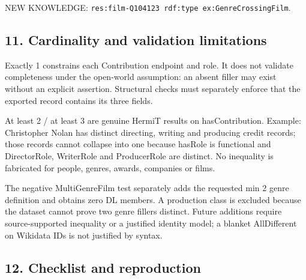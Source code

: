 \documentclass[
  11pt,
]{article}
\begin{document}
NEW KNOWLEDGE:
\texttt{res:\allowbreak{}film\allowbreak{}-\allowbreak{}\allowbreak{}Q104123\allowbreak{} rdf:\allowbreak{}typ\allowbreak{}e ex:\allowbreak{}\allowbreak{}Gen\allowbreak{}re\allowbreak{}Crossi\allowbreak{}ng\allowbreak{}Film}.

\subsection{11. Cardinality and validation
limitations}\label{cardinality-and-validation-limitations}

Exactly 1 constrains each Contribution endpoint and role. It does not
validate completeness under the open-world assumption: an absent filler
may exist without an explicit assertion. Structural checks must
separately enforce that the exported record contains its three fields.

At least 2 / at least 3 are genuine HermiT results on
has\allowbreak{}Contr\allowbreak{}ibution.\allowbreak{} Example:
Christopher Nolan has distinct directing, writing and producing credit
records; those records cannot collapse into one because hasRole is
functional and Director\allowbreak{}\allowbreak{}Role, WriterRole and
ProducerRole are distinct. No inequality is fabricated for people,
genres, awards, companies or films.

The negative Multi\allowbreak{}Gen\allowbreak{}re\allowbreak{}Film test
separately adds the requested min 2 genre definition and obtains zero DL
members. A production class is excluded because the dataset cannot prove
two genre fillers distinct. Future additions require
source-\allowbreak{}s\allowbreak{}upported\allowbreak{} inequality or a
justified identity model; a blanket AllDifferent on Wikidata IDs is not
justified by syntax.

\subsection{12. Checklist and
reproduction}\label{checklist-and-reproduction}
\end{document}
